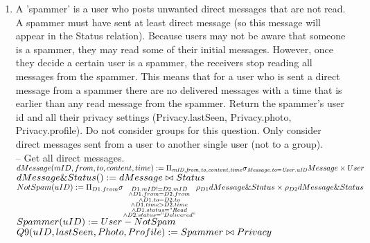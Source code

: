 \documentclass{article}
\newcommand{\var}[1]{\mathit{#1}}
\begin{document}
\begin{enumerate}
\item   %
A 'spammer' is a user who posts unwanted direct messages that are not read. A spammer must have sent at least direct message (so this message will appear in the Status relation). Because users may not be aware that someone is a spammer, they may read some of their initial messages. However, once they decide a certain user is a spammer, the receivers stop reading all messages from the spammer. This means that for a user who is sent a direct message from a spammer there are no delivered messages with a time that is earlier than any read message from the spammer. Return the spammer's user id and all their privacy settings (Privacy.lastSeen, Privacy.photo, Privacy.profile). Do not consider groups for this question. Only consider direct messages sent from a user to another single user (not to a group). \\ [5pt]
\large{
\hspace*{1cm} -- Get all direct messages. \\ [5pt]
$
dMessage(mID, from, to, content, time) := \Pi_{\var{mID}, \var{from}, \var{to}, \var{content}, \var{time}} \\
\sigma_{\var{Message.to} = \var{User.uID}} Message \times User \\ [5pt]
$
$dMessage\&Status() := dMessage \bowtie Status \\ [5pt]
$
$
NotSpam(uID) := \Pi_{D1.from} \sigma_{\substack{D1.mID != D2.mID \\
																\wedge D1.from = D2.from \\
																\wedge D1.to = D2.to \\
																\wedge D1.time > D2.time \\
																\wedge D1.status = "Read \\
																\wedge D2.status = "Delivered"}}
																\rho_{D1} dMessage\&Status \times \\
																\rho_{D2} dMessage\&Status \\ [5pt]
$
$
Spammer(uID) := User - NotSpam\\ [5pt]
$
$
Q9(uID, lastSeen, Photo, Profile) := Spammer \bowtie Privacy \\ [5pt]													
$
}


\end{enumerate}



\end{document}
